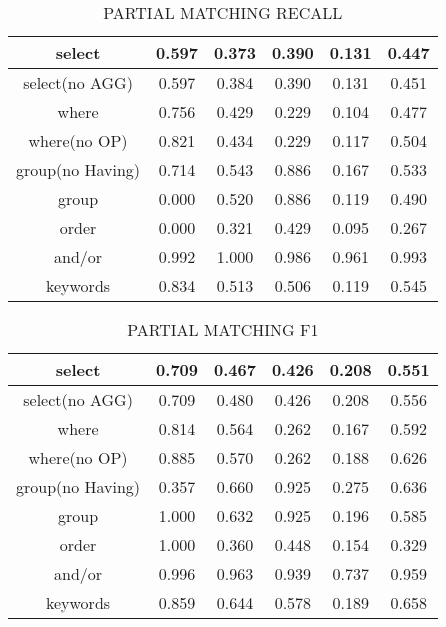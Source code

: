 \begin{table}[h!]
    \centering
    \begin{tabular}{|c|c|c|c|c|c|}
        \hline
        select           & 0.597 & 0.373 & 0.390 & 0.131 & 0.447 \\ \hline
        select(no AGG)   & 0.597 & 0.384 & 0.390 & 0.131 & 0.451 \\ \hline
        where            & 0.756 & 0.429 & 0.229 & 0.104 & 0.477 \\ \hline
        where(no OP)     & 0.821 & 0.434 & 0.229 & 0.117 & 0.504 \\ \hline
        group(no Having) & 0.714 & 0.543 & 0.886 & 0.167 & 0.533 \\ \hline
        group            & 0.000 & 0.520 & 0.886 & 0.119 & 0.490 \\ \hline
        order            & 0.000 & 0.321 & 0.429 & 0.095 & 0.267 \\ \hline
        and/or           & 0.992 & 1.000 & 0.986 & 0.961 & 0.993 \\ \hline

        keywords         & 0.834 & 0.513 & 0.506 & 0.119 & 0.545 \\ \hline
    \end{tabular}
    \caption{PARTIAL MATCHING RECALL }

\end{table}
\begin{table}[h!]
    \centering
    \begin{tabular}{|c|c|c|c|c|c|}
        \hline
        select           & 0.709 & 0.467 & 0.426 & 0.208 & 0.551 \\ \hline
        select(no AGG)   & 0.709 & 0.480 & 0.426 & 0.208 & 0.556 \\ \hline
        where            & 0.814 & 0.564 & 0.262 & 0.167 & 0.592 \\ \hline
        where(no OP)     & 0.885 & 0.570 & 0.262 & 0.188 & 0.626 \\ \hline
        group(no Having) & 0.357 & 0.660 & 0.925 & 0.275 & 0.636 \\ \hline
        group            & 1.000 & 0.632 & 0.925 & 0.196 & 0.585 \\ \hline
        order            & 1.000 & 0.360 & 0.448 & 0.154 & 0.329 \\ \hline
        and/or           & 0.996 & 0.963 & 0.939 & 0.737 & 0.959 \\ \hline

        keywords         & 0.859 & 0.644 & 0.578 & 0.189 & 0.658 \\ \hline
    \end{tabular}
    \caption{PARTIAL MATCHING F1 }

\end{table}
\pagebreak

